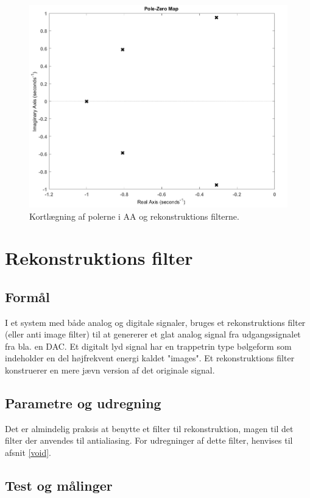 \begin{figure}[h!]
	\centering
	\includegraphics[scale = 0.4]{./billeder/pzmap.png}
	\caption{Kortlægning af polerne i AA og rekonstruktions filterne.}
	\label{fig:afilter_pol}
\end{figure}
\FloatBlock
\section{Rekonstruktions filter}
\subsection{Formål}
I et system med både analog og digitale signaler, bruges et rekonstruktions filter (eller anti image filter) til at genererer et glat analog signal fra udgangssignalet fra bla. en DAC. Et digitalt lyd signal har en trappetrin type bølgeform som indeholder en del højfrekvent energi kaldet "images". Et rekonstruktions filter konstruerer en mere jævn version af det originale signal.
\subsection{Parametre og udregning}
Det er almindelig praksis at benytte et filter til rekonstruktion, magen til det filter der anvendes til antialiasing. For udregninger af dette filter, henvises til afsnit \ref{void}.
\subsection{Test og målinger}